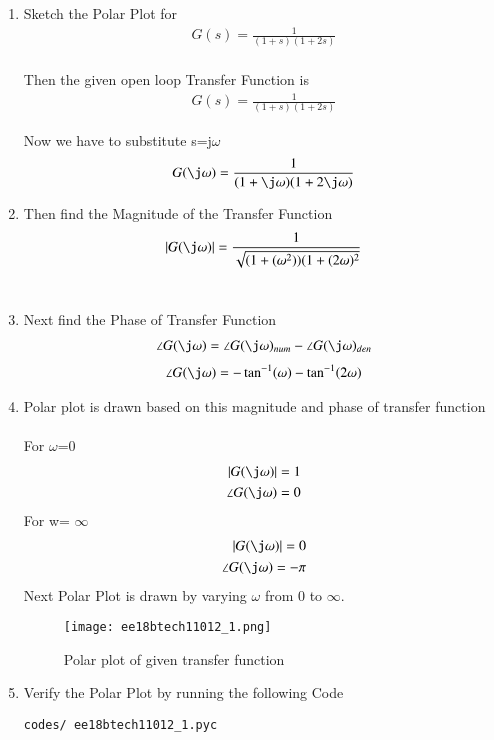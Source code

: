 \begin{enumerate}[label=\thesection.\arabic*.,ref=\thesection.\theenumi]
\item
Sketch the Polar Plot for
\begin{align}
G(s) = \frac{1}{(1+s)(1+2s)}
\end{align}
\\
\solution  Then the given open loop Transfer Function is
\begin{align}
G(s) = \frac{1}{(1+s)(1+2s)}
\end{align}

Now we have to substitute s=j$\omega$\\
\begin{align}
G(\j\omega) = \frac{1}{(1+\j\omega)(1+2\j\omega)} 
\end{align}
\item
Then find the Magnitude of the Transfer Function
\\
\solution
\begin{multline}
      |G(\j\omega)| = \frac{1}{\sqrt{(1+(\omega^2))(1+(2\omega)^2}}
\end{multline}\\
\item
Next find the Phase of Transfer Function\\
\solution
\begin{align}
    \angle G(\j\omega) = \angle G(\j\omega)_{num} - \angle G(\j\omega)_{den}
\end{align}
\begin{multline}
    \angle G(\j\omega) = -\tan^{-1}(\omega)-\tan^{-1}(2\omega)
\end{multline}
\item
Polar plot is drawn based on this magnitude and phase of transfer function\\
\solution\\
For $\omega$=0 
\begin{align}
    |G(\j\omega)| = 1\\
    \angle G(\j\omega) = 0
\end{align}
For w= $\infty$
\begin{align}
    |G(\j\omega)| = 0\\
    \angle G(\j\omega) = -\pi
\end{align}
Next Polar Plot is drawn by varying $\omega$ from 0 to $\infty$.\\
\begin{figure}
    \centering
    \texttt{[image: ee18btech11012\_1.png]}
    \caption{Polar plot of given transfer function}
    \label{fig:Graph}
\end{figure}
\item
Verify the Polar Plot by running the following Code\\
\begin{lstlisting}
codes/ ee18btech11012_1.pyc
\end{lstlisting}
\end{enumerate}
